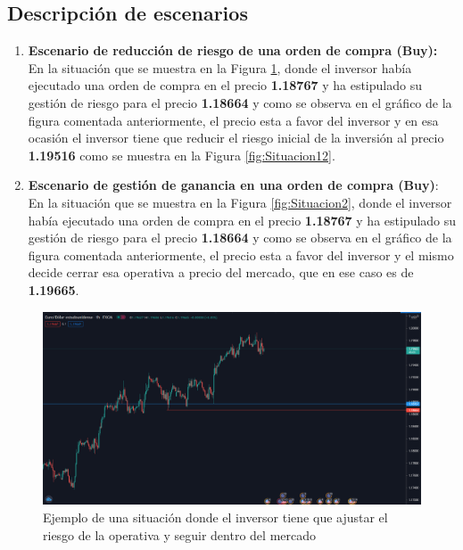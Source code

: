 \subsection{Descripción de escenarios}
\begin{enumerate}
	\item  \textbf{Escenario de reducción de riesgo de una orden de compra (Buy):} En la situación que se muestra en la Figura \ref{fig:Situacion1}, donde el inversor había ejecutado una orden de compra en el precio \textbf{1.18767} y ha estipulado su gestión de riesgo para el precio \textbf{1.18664} y como se observa en el gráfico de la figura comentada anteriormente, el precio esta a favor del inversor y en esa ocasión el inversor tiene que reducir el riesgo inicial de la inversión al precio \textbf{1.19516} como se muestra en la Figura \ref{fig:Situacion12}.	
	\item  \textbf{Escenario de gestión de ganancia en una orden de compra (Buy)}: En la situación que se muestra en la Figura \ref{fig:Situacion2}, donde el inversor había ejecutado una orden de compra en el precio \textbf{1.18767} y ha estipulado su gestión de riesgo para el precio \textbf{1.18664} y como se observa en el gráfico de la figura comentada anteriormente, el precio esta a favor del inversor y el mismo decide cerrar esa operativa a precio del mercado, que en ese caso es de \textbf{1.19665}.	
\end{enumerate}
\begin{figure}[H]
    \centering
    \includegraphics[scale=0.30]{imagenes/Situacion1.png}
    \caption{\label{fig:Situacion1}Ejemplo de una situación donde el inversor tiene que ajustar el riesgo de la operativa y seguir dentro del mercado}
  \end{figure}
